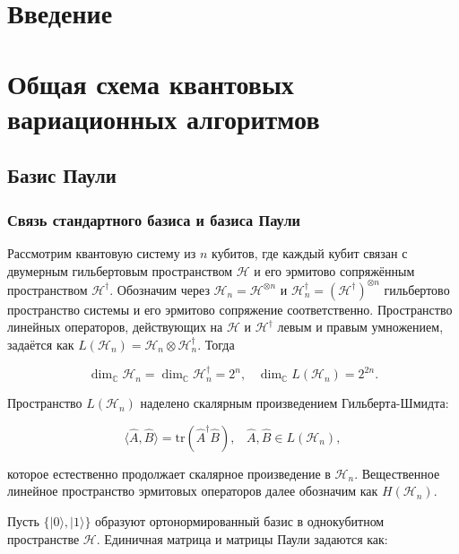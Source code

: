 \documentclass[a4paper]{report}
\begin{document}
\setcounter{page}{2}
\tableofcontents
\newpage

\chapter*{Введение}

\chapter{Общая схема квантовых вариационных алгоритмов}

\section{Базис Паули}
\subsection{Связь стандартного базиса и базиса \mbox{Паули}}

Рассмотрим квантовую систему из ${n}$ кубитов, где каждый кубит связан с двумерным гильбертовым пространством ${\mathcal{H}}$ и его эрмитово сопряжённым пространством ${\mathcal{H}^\dagger}$. Обозначим через ${\mathcal{H}_n = \mathcal{H}^{\otimes n}}$ и ${\mathcal{H}_n^\dagger = (\mathcal{H}^\dagger)^{\otimes n}}$ гильбертово пространство системы и его эрмитово сопряжение соответственно. Пространство линейных операторов, действующих на ${\mathcal{H}}$ и ${\mathcal{H}^\dagger}$ левым и правым умножением, задаётся как ${L(\mathcal{H}_n) = \mathcal{H}_n \otimes \mathcal{H}_n^\dagger}$. Тогда

$${\dim_\mathbb{C} \mathcal{H}_n = \dim_\mathbb{C} \mathcal{H}_n^\dagger = 2^n,\;\;\;
            \dim_\mathbb{C} L(\mathcal{H}_n) = 2^{2n}.}$$

Пространство ${L(\mathcal{H}_n)}$ наделено скалярным произведением Гильберта-Шмидта:

\begin{equation}\label{eq1}
    \langle\hat{A},\hat{B}\rangle = \mathrm{tr}(\hat{A}^\dagger\hat{B}),\;\;\;
    \hat{A},\hat{B} \in L(\mathcal{H}_n),
\end{equation}

\noindent которое естественно продолжает скалярное произведение в ${\mathcal{H}_n}$. Вещественное линейное пространство эрмитовых операторов далее обозначим как ${H(\mathcal{H}_n)}$.


Пусть ${\{|0\rangle,|1\rangle\}}$ образуют ортонормированный базис в однокубитном пространстве ${\mathcal{H}}$. Единичная матрица и матрицы Паули задаются как:
\end{document}

